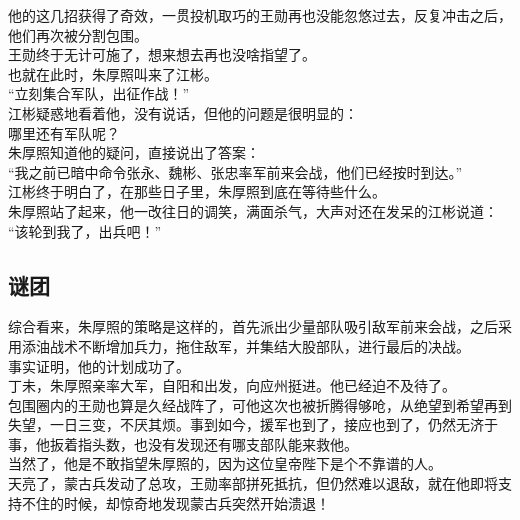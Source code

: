 \begin{multicols}{\theparacolNo}
他的这几招获得了奇效，一贯投机取巧的王勋再也没能忽悠过去，反复冲击之后，他们再次被分割包围。\\

王勋终于无计可施了，想来想去再也没啥指望了。\\

也就在此时，朱厚照叫来了江彬。\\

“立刻集合军队，出征作战！”\\

江彬疑惑地看着他，没有说话，但他的问题是很明显的：\\

哪里还有军队呢？\\

朱厚照知道他的疑问，直接说出了答案：\\

“我之前已暗中命令张永、魏彬、张忠率军前来会战，他们已经按时到达。”\\

江彬终于明白了，在那些日子里，朱厚照到底在等待些什么。\\

朱厚照站了起来，他一改往日的调笑，满面杀气，大声对还在发呆的江彬说道：\\

“该轮到我了，出兵吧！”\\

\subsection{谜团}
综合看来，朱厚照的策略是这样的，首先派出少量部队吸引敌军前来会战，之后采用添油战术不断增加兵力，拖住敌军，并集结大股部队，进行最后的决战。\\

事实证明，他的计划成功了。\\

丁未，朱厚照亲率大军，自阳和出发，向应州挺进。他已经迫不及待了。\\

包围圈内的王勋也算是久经战阵了，可他这次也被折腾得够呛，从绝望到希望再到失望，一日三变，不厌其烦。事到如今，援军也到了，接应也到了，仍然无济于事，他扳着指头数，也没有发现还有哪支部队能来救他。\\

当然了，他是不敢指望朱厚照的，因为这位皇帝陛下是个不靠谱的人。\\

天亮了，蒙古兵发动了总攻，王勋率部拼死抵抗，但仍然难以退敌，就在他即将支持不住的时候，却惊奇地发现蒙古兵突然开始溃退！\\


\end{multicols}
